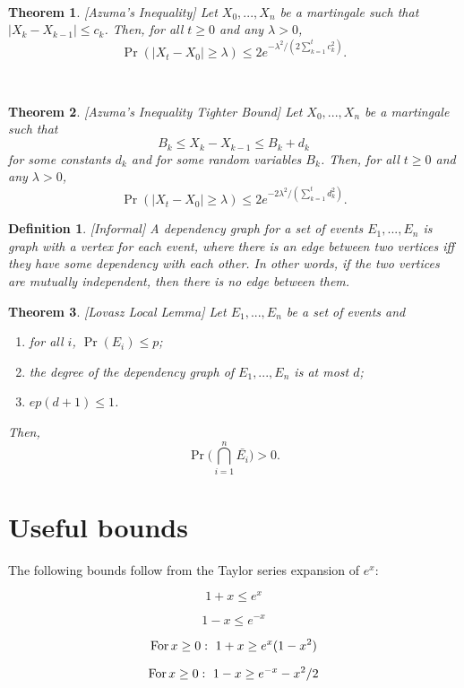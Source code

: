 \documentclass[11pt]{article}
\theoremstyle{mytheoremstyle}
\newtheorem{theorem}{Theorem}
\newtheorem{definition}{Definition}
\begin{document}
~
\begin{theorem}
	\emph{{[}Azuma's Inequality{]}} Let $X_{0},...,X_{n}$ be a martingale
	such that $|X_{k}-X_{k-1}|\leq c_{k}$. Then, for all $t\geq0$ and
	any $\lambda>0$,
	\[
	\Pr(|X_{t}-X_{0}|\geq\lambda)\leq2e^{-\lambda^{2}/(2\sum_{k=1}^{t}c_{k}^{2})}.
	\]
\end{theorem}
~
\begin{theorem}
	\emph{{[}Azuma's Inequality \textendash{} Tighter Bound{]} }Let $X_{0},...,X_{n}$
	be a martingale such that 
	\[
	B_{k}\leq X_{k}-X_{k-1}\leq B_{k}+d_{k}
	\]
	for some constants $d_{k}$ and for some random variables $B_{k}$.
	Then, for all $t\geq0$ and any $\lambda>0$,
	\[
	\Pr(|X_{t}-X_{0}|\geq\lambda)\leq2e^{-2\lambda^{2}/(\sum_{k=1}^{t}d_{k}^{2})}.
	\]
\end{theorem}
\begin{definition}
	{[}Informal{]} A \emph{dependency graph} for a set of events $E_{1},...,E_{n}$
	is graph with a vertex for each event, where there is an edge between
	two vertices iff they have some dependency with each other. In other
	words, if the two vertices are mutually independent, then there is
	no edge between them.
\end{definition}
\begin{theorem}
	\emph{{[}Lovasz Local Lemma{]} }Let $E_{1},...,E_{n}$ be a set of
	events and 
	
	\begin{enumerate}
		\item for all $i$, $\Pr(E_{i})\leq p$;
		\item \textup{\emph{the degree of the dependency graph of $E_{1},...,E_{n}$
				is at most $d$;}}
		\item $ep(d+1)\leq1$.
	\end{enumerate}
	Then,
	\[
	\Pr\big(\bigcap_{i=1}^{n}\bar{E_{i}}\big)>0.
	\]
	
\end{theorem}

\section{Useful bounds}

The following bounds follow from the Taylor series expansion of $e^{x}$:

\[
1+x\leq e^{x}
\]

\[
1-x\leq e^{-x}
\]

\[
\text{{For\,}}x\geq0:\,\,1+x\geq e^{x}(1-x^{2})
\]

\[
\text{{For\,}}x\geq0:\,\,1-x\geq e^{-x}-x^{2}/2
\]


\end{document}
